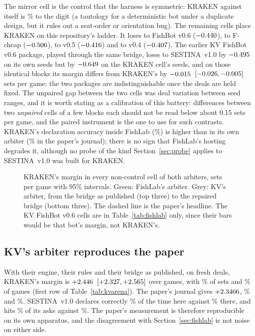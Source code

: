 \documentclass[11pt]{article}
\newcommand{\sestina}{\mbox{SESTINA v1.0}}
\newcommand{\pct}{\%}
\begin{document}
The mirror cell is the control that the harness is symmetric: KRAKEN against itself is
\kcEMirrorWin\pct{} to the digit (a tautology for a deterministic bot under a duplicate design, but
it rules out a seat-order or orientation bug). The remaining cells place KRAKEN on this repository's ladder. It loses
to FishBot v0.6 ($-0.440$), to F-cheap ($-0.506$), to v0.5
($-0.416$) and to v0.4 ($-0.407$). The earlier KV FishBot v0.6 package, played through the same bridge, loses to \sestina{} by
$-0.495$ on its own seeds but by $-0.649$ on the KRAKEN cell's seeds, and on
those identical blocks its margin differs from KRAKEN's by $-0.015$~$[-0.026,
-0.005]$ sets per game: the two packages are indistinguishable once the deals are held
fixed. The unpaired gap between the two cells was deal variation between seed ranges, and it is worth
stating as a calibration of this battery: differences between two \emph{unpaired} cells of a few
blocks each should not be read below about 0.15 sets per game, and the paired instrument is the one to
use for such contrasts. KRAKEN's declaration accuracy inside FishLab
(\kcEDefaultDeclA\pct{}) is higher than in its own arbiter (\kcMegaDeclKV\pct{} in the paper's
journal); there is no sign that FishLab's hosting degrades it, although no probe of the kind
Section~\ref{sec:probe} applies to \sestina{} was built for KRAKEN.

\begin{figure}[!ht]
\centering

\caption{KRAKEN's margin in every non-control cell of both arbiters, sets per game with 95\pct{}
intervals. Green: FishLab's arbiter. Grey: KV's arbiter, from the bridge as published (top three) to
the repaired bridge (bottom three). The dashed line is the paper's headline. The KV FishBot v0.6 cells
are in Table~\ref{tab:fishlab} only, since their bars would be that bot's margin, not KRAKEN's.}
\label{fig:margins}
\end{figure}

\subsection{KV's arbiter reproduces the paper}
\label{sec:kv}

With their engine, their rules and their bridge as published, on fresh deals, KRAKEN's margin is
$+2.446$~$[+2.327, +2.565]$ over \kcVRevTwoGames{} games, with
\kcVRevTwoSetShare\pct{} of sets and \kcVRevTwoWin\pct{} of games (first row of
Table~\ref{tab:kvarena}). The paper's journal gives $+2.3466$, \kcMegaSetShare\pct{} and
\kcMegaWin\pct{}. \sestina{} declares correctly \kcVRevTwoDeclS\pct{} of the time here against
\kcMegaDeclS\pct{} there, and hits \kcVRevTwoAskS\pct{} of its asks against \kcMegaAskS\pct{}. The
paper's measurement is therefore reproducible on its own apparatus, and the disagreement with
Section~\ref{sec:fishlab} is not noise on either side.
\end{document}

